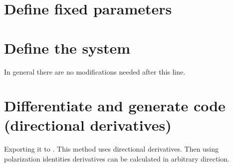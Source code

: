 \documentclass[letterpaper,10pt,english]{jupyterBook}
\begin{document}
\section{Define fixed parameters}
\label{\detokenize{BazykinGenSym:define-fixed-parameters}}
\begin{sphinxVerbatim}[commandchars=\\\{\}]
\end{sphinxVerbatim}


\section{Define the system}
\label{\detokenize{BazykinGenSym:define-the-system}}
\begin{sphinxVerbatim}[commandchars=\\\{\}]
\PYGZca{}
\PYGZca{}
\PYG{p}{[}\PYG{p}{]}
\end{sphinxVerbatim}

\sphinxAtStartPar
In general there are no modifications needed after this line.


\section{Differentiate and generate code (directional derivatives)}
\label{\detokenize{BazykinGenSym:differentiate-and-generate-code-directional-derivatives}}
\sphinxAtStartPar
Exporting it to . This method uses directional derivatives.
Then using polarization identities derivatives can be calculated in arbitrary
direction.
\end{document}
